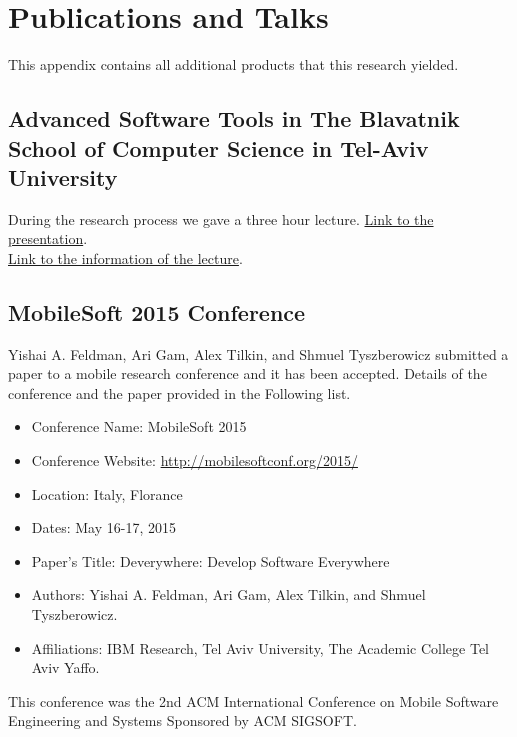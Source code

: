 \chapter{Publications and Talks}
This appendix contains all additional products that this research yielded.

\section{Advanced Software Tools in The Blavatnik School of Computer Science in Tel-Aviv University}
During the research process we gave a three hour lecture. \href{https://www.icloud.com/keynote/AwBWCAESEMmhJ9LSgI9wRLhfRTk81c4aKj7lviy1R3R9Yf61KLkOjxnc8qt5FRwhMAmuF5qYNCPOZK9QGyrifKcccAMCUCAQEEIDx6Kr_gzGatd8ip7oAT1CRKjYgJolac-V7YeH3kQRO3#Deverywhere-TAU}{Link to the presentation}.
\\\href{http://www.cs.tau.ac.il/~amiramy/SoftwareSeminar/alexTilkinJan2015.html}{Link to the information of the lecture}.
\section{MobileSoft 2015 Conference}
Yishai A. Feldman, Ari Gam, Alex Tilkin, and Shmuel Tyszberowicz submitted a paper to a mobile research conference and it has been accepted. Details of the conference and the paper provided in the Following list.
\begin{itemize}
	\item Conference Name: MobileSoft 2015
	\item Conference Website: \url{http://mobilesoftconf.org/2015/}
	\item Location: Italy, Florance
	\item Dates: May 16-17, 2015
	\item Paper's Title: Deverywhere: Develop Software Everywhere
	\item Authors: Yishai A. Feldman, Ari Gam, Alex Tilkin, and Shmuel Tyszberowicz.
	\item Affiliations: IBM Research, Tel Aviv University, The Academic College Tel Aviv Yaffo.
\end{itemize}
This conference was the 2nd ACM International Conference on Mobile Software Engineering and Systems Sponsored by ACM SIGSOFT.
